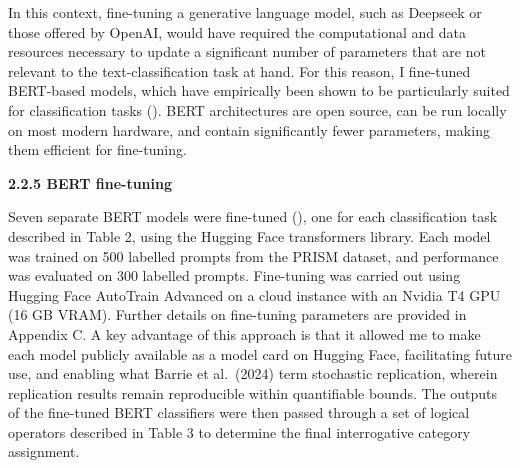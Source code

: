 \documentclass[
  12pt,
]{article}
\begin{document}
In this context, fine-tuning a generative language model, such as Deepseek or those offered by OpenAI, would have required the computational and data resources necessary to update a significant number of parameters that are not relevant to the text-classification task at hand. For this reason, I fine-tuned BERT-based models, which have empirically been shown to be particularly suited for classification tasks (). BERT architectures are open source, can be run locally on most modern hardware, and contain significantly fewer parameters, making them efficient for fine-tuning.

\textbf{2.2.5 BERT fine-tuning}

Seven separate BERT models were fine-tuned (), one for each classification task described in Table 2, using the Hugging Face transformers library. Each model was trained on 500 labelled prompts from the PRISM dataset, and performance was evaluated on 300 labelled prompts. Fine-tuning was carried out using Hugging Face AutoTrain Advanced on a cloud instance with an Nvidia T4 GPU (16 GB VRAM). Further details on fine-tuning parameters are provided in Appendix C. A key advantage of this approach is that it allowed me to make each model publicly available as a model card on Hugging Face, facilitating future use, and enabling what Barrie et al.~(2024) term stochastic replication, wherein replication results remain reproducible within quantifiable bounds. The outputs of the fine-tuned BERT classifiers were then passed through a set of logical operators described in Table 3 to determine the final interrogative category assignment.
\end{document}
